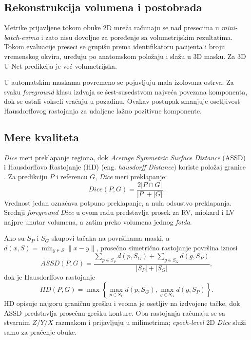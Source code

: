 \documentclass[11pt,a4paper]{article}
\begin{document}
\subsection{Rekonstrukcija volumena i postobrada}
Metrike prijavljene tokom obuke 2D mreža računaju se nad presecima u \textit{mini-batch-evima} i zato nisu
dovoljne za poređenje sa volumetrijskim rezultatima. Tokom evaluacije preseci se grupišu prema
identifikatoru pacijenta i broju vremenskog okvira, uređuju po anatomskom položaju i slažu u 3D
masku. Za 3D U-Net predikcija je već volumetrijska.

U automatskim maskama povremeno se pojavljuju mala izolovana ostrva. Za svaku \textit{foreground} klasu
izdvaja se šest-susedstvom najveća povezana komponenta, dok se ostali vokseli vraćaju u pozadinu.
Ovakav postupak smanjuje osetljivost Hausdorffovog rastojanja za udaljene lažno pozitivne
komponente.

\subsection{Mere kvaliteta}
\textit{Dice} meri preklapanje regiona, dok \textit{Acerage Symmetric Surface Distance} (ASSD) i
Hausdorffovo Rastojanje (HD) (eng. \textit{hausdorff Distance}) koriste položaj granice
\cite{taha2015}. Za predikciju $P$ i referencu $G$, \textit{Dice} meri preklapanje:
\begin{equation}
	Dice(P,G)=\frac{2|P\cap G|}{|P|+|G|}.
\end{equation}
Vrednost jedan označava potpuno preklapanje, a nula odsustvo preklapanja. Srednji \textit{foreground} \textit{Dice} u
ovom radu predstavlja prosek za RV, miokard i LV najpre unutar volumena, a zatim preko volumena
jednog \textit{folda}.

Ako su $S_P$ i $S_G$ skupovi tačaka na površinama maski, a $d(x,S)=\min_{y\in S}\|x-y\|$, prosečno
simetrično rastojanje površina iznosi
\begin{equation}
	ASSD(P,G)=\frac{\sum_{p\in S_P}d(p,S_G)+\sum_{g\in S_G}d(g,S_P)}{|S_P|+|S_G|},
\end{equation}
dok je Hausdorffovo rastojanje
\begin{equation}
	HD(P,G)=\max\left\{\max_{p\in S_P}d(p,S_G),\max_{g\in S_G}d(g,S_P)\right\}.
\end{equation}
HD opisuje najgoru graničnu grešku i veoma je osetljiv na izdvojene tačke, dok ASSD predstavlja
prosečnu grešku konture. Oba rastojanja računaju se sa stvarnim $Z/Y/X$ razmakom i prijavljuju u
milimetrima; \textit{epoch-level} 2D \textit{Dice} služi samo za praćenje obuke.
\end{document}
